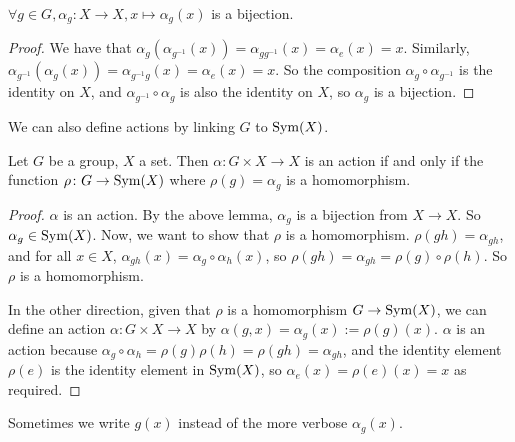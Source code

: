 \begin{lemma}
	\(\forall g \in G, \alpha_g: X \to X, x \mapsto \alpha_g(x)\) is a bijection.
\end{lemma}
\begin{proof}
	We have that \(\alpha_g(\alpha_{g^{-1}}(x)) = \alpha_{g g^{-1}}(x) = \alpha_e(x) = x\).
	Similarly, \(\alpha_{g^{-1}}(\alpha_g(x)) = \alpha_{g^{-1} g}(x) = \alpha_e(x) = x\).
	So the composition \(\alpha_g \circ \alpha_{g^{-1}}\) is the identity on \(X\), and \(\alpha_{g^{-1}} \circ \alpha_g\) is also the identity on \(X\), so \(\alpha_g\) is a bijection.
\end{proof}
We can also define actions by linking \(G\) to \(\operatorname{Sym}(X)\).
\begin{proposition}
	Let \(G\) be a group, \(X\) a set.
	Then \(\alpha\colon G \times X \to X\) is an action if and only if the function \(\rho\colon G \to \operatorname{Sym}(X)\) where \(\rho(g) = \alpha_g\) is a homomorphism.
\end{proposition}
\begin{proof}
	\(\alpha\) is an action.
	By the above lemma, \(\alpha_g\) is a bijection from \(X \to X\).
	So \(\alpha_g \in \operatorname{Sym}(X)\).
	Now, we want to show that \(\rho\) is a homomorphism.
	\(\rho(gh) = \alpha_{gh}\), and for all \(x \in X\), \(\alpha_{gh}(x) = \alpha_g \circ \alpha_h (x)\), so \(\rho(gh) = \alpha_{gh} = \rho(g)\circ\rho(h)\).
	So \(\rho\) is a homomorphism.

	In the other direction, given that \(\rho\) is a homomorphism \(G \to \operatorname{Sym}(X)\), we can define an action \(\alpha\colon G \times X \to X\) by \(\alpha(g, x) = \alpha_g(x) := \rho(g)(x)\).
	\(\alpha\) is an action because \(\alpha_g \circ \alpha_h = \rho(g)\rho(h) = \rho(gh) = \alpha_{gh}\), and the identity element \(\rho(e)\) is the identity element in \(\operatorname{Sym}(X)\), so \(\alpha_e(x) = \rho(e)(x) = x\) as required.
\end{proof}
Sometimes we write \(g(x)\) instead of the more verbose \(\alpha_g(x)\).

